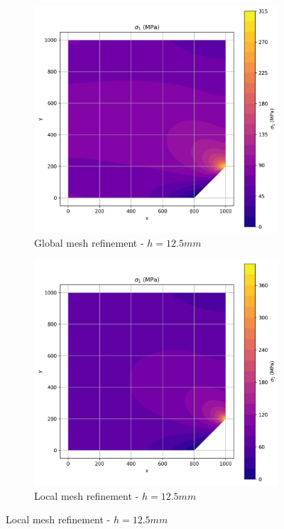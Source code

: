 \begin{figure}[H]
  \centering
  \begin{subfigure}[b]{0.45\textwidth}
    \centering
    \includegraphics[width=\textwidth]{GRAFICOS/Quad4/1.5mm_global/resultados - sigma_1.png}
    \caption{Global mesh refinement - $h=12.5mm$}
    \label{fig:img12}
  \end{subfigure}
  \hfill
  \begin{subfigure}[b]{0.45\textwidth}
    \centering
    \includegraphics[width=\textwidth]{GRAFICOS/Quad4/1.5mm_local/resultados - sigma_1.png}
    \caption{Local mesh refinement - $h=12.5mm$}
    \label{fig:img22}
  \end{subfigure}
\end{figure}

